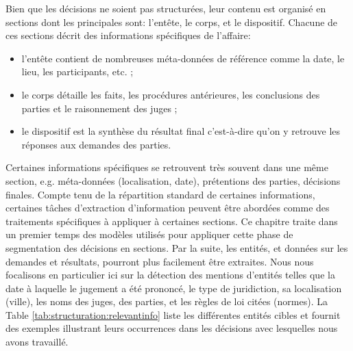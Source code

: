 Bien que les décisions ne soient pas structurées, leur contenu est organisé en sections dont les principales sont: l'entête, le corps, et le dispositif. Chacune de ces sections décrit des informations spécifiques de l'affaire: 
\begin{itemize}
	\item l'entête contient de nombreuses méta-données de référence comme la date, le lieu, les participants, etc. ;
	\item le corps détaille les faits, les procédures antérieures, les conclusions des parties et le raisonnement des juges ;
	\item le dispositif est la synthèse du résultat final c'est-à-dire qu'on y retrouve les réponses aux demandes des parties.
\end{itemize}

Certaines informations spécifiques se retrouvent très souvent dans une même section, e.g. méta-données (localisation, date), prétentions des parties, décisions finales. Compte tenu de la répartition standard de certaines informations, certaines tâches d'extraction d'information peuvent être abordées comme des traitements spécifiques à appliquer à certaines sections. Ce chapitre traite dans un premier temps des modèles utilisés pour appliquer cette phase de segmentation des décisions en sections. Par la suite, les entités, et données sur les demandes et résultats, pourront plus facilement être extraites. Nous nous focalisons en particulier ici sur la détection des mentions d'entités telles que la date à laquelle le jugement a été prononcé, le type de juridiction, sa localisation (ville), les noms des juges, des parties, et les règles de loi citées (normes). La Table \ref{tab:structuration:relevantinfo} liste les différentes entités cibles et fournit des exemples illustrant leurs occurrences dans les décisions avec lesquelles nous avons travaillé.

